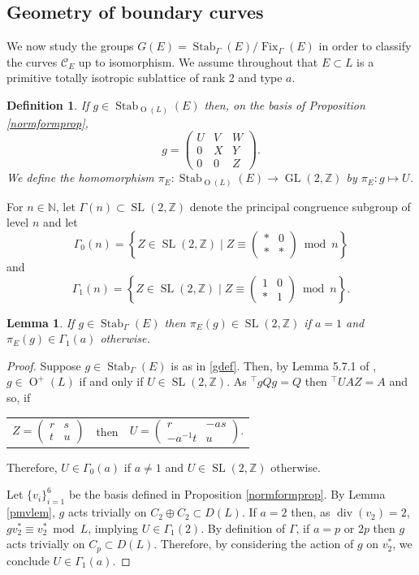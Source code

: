 \documentclass[11pt]{article}
\newtheorem{lem}[thm]{Lemma}
\newtheorem{defn}[thm]{Definition}
\newcommand{\ZZ}{\mathbb{Z}}
\newcommand{\NN}{\mathbb{N}}
\newcommand{\cc}{\mathcal{C}}
\newcommand{\opn}{\operatorname}
\newcommand{\op}{\oplus}
\newcommand{\beq}{\begin{equation*}}
\newcommand{\eeq}{\end{equation*}}
\newcommand{\bpm}{\begin{pmatrix}}
\newcommand{\epm}{\end{pmatrix}}
\begin{document}
\subsection{Geometry of boundary curves}
  We now study the groups $G(E) = \opn{Stab}_{\Gamma}(E) / \opn{Fix}_{\Gamma}(E)$ in order to classify the curves $\cc_E$ up to  isomorphism.
  We assume throughout that $E \subset L$ is a primitive totally isotropic sublattice of rank 2 and type $a$.
  \begin{defn}
    If $g \in \opn{Stab}_{\opn{O}(L)}(E)$ then, on the basis of Proposition \ref{normformprop},
    \begin{equation}\label{gdef}
    g =
    \bpm
    U & V & W \\
    0 & X & Y \\
    0 & 0 & Z
    \epm.
    \end{equation}
    We define the homomorphism
    $\pi_E: \opn{Stab}_{\opn{O}(L)}(E) \rightarrow \opn{GL}(2, \ZZ)$
    by $\pi_E:g \mapsto U$.
  \end{defn}
For $n \in \NN$, let $\Gamma(n) \subset \opn{SL}(2, \ZZ)$ denote the principal congruence subgroup of level $n$ and let  
\beq
\Gamma_0(n) =
\left \{
Z \in \opn{SL}(2, \ZZ) \mid
Z \equiv \bpm * & 0 \\ * & * \epm \bmod{ n}
\right \}
\eeq
and
\beq
\Gamma_1(n) =
\left \{
Z \in \opn{SL}(2, \ZZ) \mid
Z \equiv \bpm 1 & 0 \\ * & 1 \epm \bmod{ n}
\right \}.
\eeq
\begin{lem}\label{piEsublem}
  If $g \in \opn{Stab}_{\Gamma}(E)$ then $\pi_E(g) \in \opn{SL}(2, \ZZ)$ if $a=1$ and $\pi_E(g) \in \Gamma_1(a)$ otherwise.
  \end{lem}
  \begin{proof}
    Suppose $g \in \opn{Stab}_{\Gamma}(E)$ is as in \eqref{gdef}.
    Then, by Lemma 5.7.1 of \cite{Brieskorn}, $g \in \opn{O}^+(L)$ if and only if $U \in \opn{SL}(2, \ZZ)$.
    As ${^{\intercal}}gQg=Q$ then ${}^{\intercal}UAZ = A$ and so, if
    \begin{center}
      \begin{tabular}{c c c}
        $Z = \bpm r & s \\ t & u \epm$
        & then &
        $U = \bpm r & -as \\ -a^{-1}t & u \epm$.
      \end{tabular}
    \end{center}
    Therefore, $U \in \Gamma_0(a)$ if $a \neq 1$ and $U \in \opn{SL}(2, \ZZ)$ otherwise.

    Let $\{ v_i \}_{i=1}^6$ be the basis defined in Proposition \ref{normformprop}.
    By Lemma \ref{pmvlem}, $g$ acts trivially on $C_2 \op C_2 \subset D(L)$.
    If $a=2$ then, as $\opn{div}(v_2)=2$, $gv_2^* \equiv v_2^* \bmod{ L}$, implying $U \in \Gamma_1(2)$.
    By definition of $\Gamma$, if $a=p$ or $2p$ then $g$ acts trivially on $C_p \subset D(L)$.
    Therefore, by considering the action of $g$ on $v_2^*$, we conclude $U \in \Gamma_1(a)$.
  \end{proof}
\end{document}
